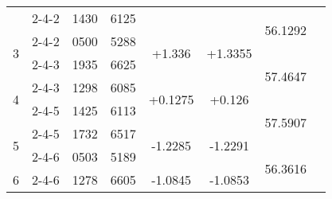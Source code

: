 \documentclass[UTF8]{ctexart}
\begin{document}
\begin{table}[h]
\begin{tabular}{|c|ccccccc|}
			& \multicolumn{1}{c|}{2-4-2}               & \multicolumn{1}{c|}{1430}  & \multicolumn{1}{c|}{6125}  & \multicolumn{1}{c|}{}                         & \multicolumn{1}{c|}{}                          & \multicolumn{1}{c|}{\multirow{2}{*}{56.1292}} &                     \\ \cline{1-6}
			\multirow{2}{*}{3}  & \multicolumn{1}{c|}{2-4-2}               & \multicolumn{1}{c|}{0500}  & \multicolumn{1}{c|}{5288}  & \multicolumn{1}{c|}{\multirow{2}{*}{+1.336}}  & \multicolumn{1}{c|}{\multirow{2}{*}{+1.3355}}  & \multicolumn{1}{c|}{}                         &                     \\ \cline{2-4} \cline{7-7}
			& \multicolumn{1}{c|}{2-4-3}               & \multicolumn{1}{c|}{1935}  & \multicolumn{1}{c|}{6625}  & \multicolumn{1}{c|}{}                         & \multicolumn{1}{c|}{}                          & \multicolumn{1}{c|}{\multirow{2}{*}{57.4647}} &                     \\ \cline{1-6}
			\multirow{2}{*}{4}  & \multicolumn{1}{c|}{2-4-3}               & \multicolumn{1}{c|}{1298}  & \multicolumn{1}{c|}{6085}  & \multicolumn{1}{c|}{\multirow{2}{*}{+0.1275}} & \multicolumn{1}{c|}{\multirow{2}{*}{+0.126}}   & \multicolumn{1}{c|}{}                         &                     \\ \cline{2-4} \cline{7-7}
			& \multicolumn{1}{c|}{2-4-5}               & \multicolumn{1}{c|}{1425}  & \multicolumn{1}{c|}{6113}  & \multicolumn{1}{c|}{}                         & \multicolumn{1}{c|}{}                          & \multicolumn{1}{c|}{\multirow{2}{*}{57.5907}} &                     \\ \cline{1-6}
			\multirow{2}{*}{5}  & \multicolumn{1}{c|}{2-4-5}               & \multicolumn{1}{c|}{1732}  & \multicolumn{1}{c|}{6517}  & \multicolumn{1}{c|}{\multirow{2}{*}{-1.2285}} & \multicolumn{1}{c|}{\multirow{2}{*}{-1.2291}}  & \multicolumn{1}{c|}{}                         &                     \\ \cline{2-4} \cline{7-7}
			& \multicolumn{1}{c|}{2-4-6}               & \multicolumn{1}{c|}{0503}  & \multicolumn{1}{c|}{5189}  & \multicolumn{1}{c|}{}                         & \multicolumn{1}{c|}{}                          & \multicolumn{1}{c|}{\multirow{2}{*}{56.3616}} &                     \\ \cline{1-6}
			\multirow{2}{*}{6}  & \multicolumn{1}{c|}{2-4-6}               & \multicolumn{1}{c|}{1278}  & \multicolumn{1}{c|}{6605}  & \multicolumn{1}{c|}{\multirow{2}{*}{-1.0845}} & \multicolumn{1}{c|}{\multirow{2}{*}{-1.0853}}  & \multicolumn{1}{c|}{}                         &                     \\ \cline{2-4} \cline{7-8} 

\end{tabular}
\end{table}
\end{document}
